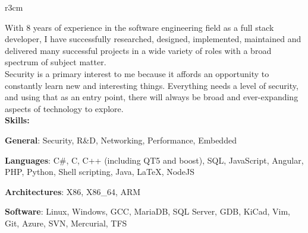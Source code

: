 \documentclass[]{SBResume}
\begin{document}
\makeheader


\begin{resume}
  
  \begin{resumetext}
    \begin{wrapfigure}{r}{3cm}
    \insertheadshot
    \end{wrapfigure}
    With 8 years of experience in the software engineering 
    field as a full stack developer, I have successfully researched, designed, 
    implemented, maintained and delivered many successful
    projects in a wide variety of roles with a broad spectrum of
    subject matter.\\
    
    Security is a primary interest to me because it affords an opportunity to
    constantly learn new and interesting things. Everything needs a
    level of security, and using that as an entry point, there will
    always be broad and ever-expanding aspects of technology to
    explore.\\
    
    \textbf{Skills:}
    \begin{resumeitemize2}
    \item{\textbf{General}: Security, R\&D, Networking, Performance, Embedded}
    \item{\textbf{Languages}: C\#, C, C++ (including QT5 and boost), SQL, JavaScript, Angular, PHP, Python, Shell scripting, Java, \LaTeX, NodeJS}
    \item{\textbf{Architectures}: X86, X86\_64, ARM}
    \item{\textbf{Software}: Linux, Windows, GCC, MariaDB, SQL Server, GDB, KiCad, Vim, Git, Azure, SVN, Mercurial, TFS}
    \end{resumeitemize2}
    



\end{resumetext}
\end{resume}
\end{document}
